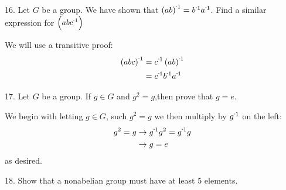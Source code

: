 \newpage
\begin{mdframed}[style=darkQuesion]
  16. Let $G$ be a group. We have shown that $\inv{\lrp{ab}}=\inv{b}\inv{a}$. 
  Find a similar expression for $\lrp{\inv{abc}}$
\end{mdframed}

\begin{mdframed}[style=darkAnswer,frametitle={Joe Starr}]
We will use a transitive proof: 
\begin{align*}
  \inv{\lrp{abc}} &= \inv{c}\inv{\lrp{ab}}\\
  &= \inv{c}\inv{b}\inv{a}
\end{align*}
\end{mdframed}
\newpage
\begin{mdframed}[style=darkQuesion]
  17. Let $G$ be a group. If $g\in G$ and $g^2=g$,then prove that $g=e$.
\end{mdframed}

\begin{mdframed}[style=darkAnswer,frametitle={Joe Starr}]
We begin with letting $g\in G$, such $g^2=g$ we then multiply by $\inv{g}$ on 
the left:
\begin{align*}
  g^2=g &\rightarrow \inv{g}g^2=\inv{g}g\\
  &\rightarrow g=e
\end{align*}
as desired. 
\end{mdframed}
\newpage
\begin{mdframed}[style=darkQuesion]
  18. Show that a nonabelian group must have at least 5 elements. 
\end{mdframed}

